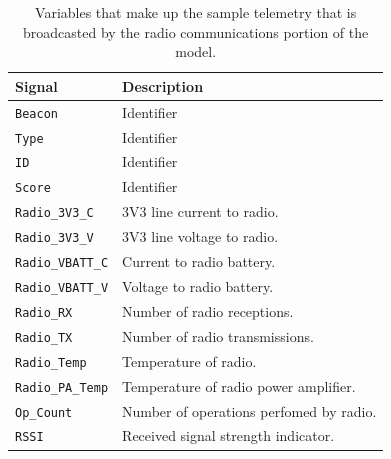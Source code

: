 \documentclass[conf]{new-aiaa}
\begin{document}
\begin{table}[!h]
\centering
\begin{tabular}{ll} 
\hline\hline
\textbf{Signal} & \textbf{Description}                     \\ 
\hline
\texttt{Beacon}          & Identifier                               \\
\texttt{Type}            & Identifier                               \\
\texttt{ID}              & Identifier                               \\
\texttt{Score}           & Identifier                               \\
\texttt{Radio\_3V3\_C}   & 3V3 line current to radio.               \\
\texttt{Radio\_3V3\_V}   & 3V3 line voltage to radio.               \\
\texttt{Radio\_VBATT\_C} & Current to radio battery.                \\
\texttt{Radio\_VBATT\_V} & Voltage to radio battery.                \\
\texttt{Radio\_RX}       & Number of radio receptions.              \\
\texttt{Radio\_TX}       & Number of radio transmissions.           \\
\texttt{Radio\_Temp}     & Temperature of radio.                    \\
\texttt{Radio\_PA\_Temp} & Temperature of radio power amplifier.    \\
\texttt{Op\_Count}       & Number of operations perfomed by radio.  \\
\texttt{RSSI}            & Received signal strength indicator.      \\
\hline\hline
\end{tabular}
\caption{Variables that make up the sample telemetry that is broadcasted by the radio communications portion of the model.}
\label{CubeSatVariables}
\end{table}

\end{document}
